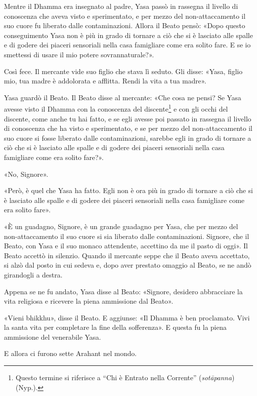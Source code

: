 Mentre il Dhamma era insegnato al padre, Yasa passò in rassegna il livello di
conoscenza che aveva visto e sperimentato, e per mezzo del non-attaccamento il
suo cuore fu liberato dalle contaminazioni. Allora il Beato pensò: «Dopo questo
conseguimento Yasa non è più in grado di tornare a ciò che si è lasciato alle
spalle e di godere dei piaceri sensoriali nella casa famigliare come era solito
fare. E se io smettessi di usare il mio potere sovrannaturale?».

Così fece. Il mercante vide suo figlio che stava lì seduto. Gli disse: «Yasa,
figlio mio, tua madre è addolorata e afflitta. Rendi la vita a tua madre».

Yasa guardò il Beato. Il Beato disse al mercante: «Che cosa ne pensi? Se Yasa
avesse visto il Dhamma con la conoscenza del discente\footnote{Questo termine si
  riferisce a “Chi è Entrato nella Corrente” (\emph{sotāpanna}) (Nyp.).} e con
gli occhi del discente, come anche tu hai fatto, e se egli avesse poi passato in
rassegna il livello di conoscenza che ha visto e sperimentato, e se per mezzo
del non-attaccamento il suo cuore si fosse liberato dalle contaminazioni,
sarebbe egli in grado di tornare a ciò che si è lasciato alle spalle e di godere
dei piaceri sensoriali nella casa famigliare come era solito fare?».

«No, Signore».

«Però, è quel che Yasa ha fatto. Egli non è ora più in grado di tornare a ciò
che si è lasciato alle spalle e di godere dei piaceri sensoriali nella casa
famigliare come era solito fare».

«È un guadagno, Signore, è un grande guadagno per Yasa, che per mezzo del
non-attaccamento il suo cuore si sia liberato dalle contaminazioni. Signore, che
il Beato, con Yasa e il suo monaco attendente, accettino da me il pasto di
oggi». Il Beato accettò in silenzio. Quando il mercante seppe che il Beato aveva
accettato, si alzò dal posto in cui sedeva e, dopo aver prestato omaggio al
Beato, se ne andò girandogli a destra.

Appena se ne fu andato, Yasa disse al Beato: «Signore, desidero abbracciare la
vita religiosa e ricevere la piena ammissione dal Beato».

«Vieni bhikkhu», disse il Beato. E aggiunse: «Il Dhamma è ben proclamato. Vivi
la santa vita per completare la fine della sofferenza». E questa fu la piena
ammissione del venerabile Yasa.

E allora ci furono sette Arahant nel mondo.

